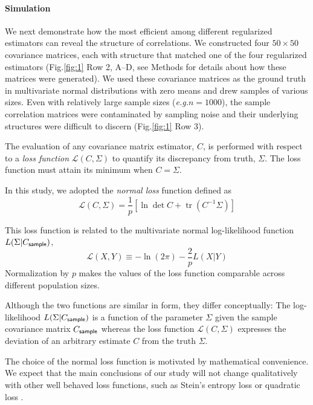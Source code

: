 \documentclass[10pt]{article}
\DeclareMathOperator{\Tr}{tr}
\newcommand{\figref}[2]{Fig.\;\ref{fig:#1}\,#2}
\newcommand{\loss}[1]{\mathcal L\left(#1\right)}
\newcommand{\eg}{\emph{e.g.}\;}
\begin{document}
\paragraph{Simulation}
We next demonstrate how the most efficient among different regularized estimators can reveal the structure of correlations.
We constructed four $50\times 50$ covariance matrices, each with structure that matched one of the four regularized estimators (\figref{1}{\,Row 2, A--D}, see Methods for details about how these matrices were generated).  We used these covariance matrices as the ground truth in multivariate normal distributions with zero means and drew samples of various sizes. Even with relatively large sample sizes (\eg $n=1000$), the sample correlation matrices were contaminated by sampling noise and their underlying structures were difficult to discern (\figref{1}{\,Row 3}). 

The evaluation of any covariance matrix estimator, $C$, is performed with respect to a \emph{loss function} $\loss{C,\Sigma}$ to quantify its discrepancy from truth, $\Sigma$.  The loss function must attain its minimum when $C=\Sigma$.

In this study, we adopted the \emph{normal loss} function defined as
\begin{equation}\label{eq:loss}
    \loss{C,\Sigma} = \frac 1 p\left[\ln \det C + \Tr(C^{-1}\Sigma)\right]
\end{equation}

This loss function is related to the multivariate normal log-likelihood function $L(\Sigma|C_{\sf sample})$,
\begin{equation}
     \loss{X,Y} \equiv -\ln(2\pi) - \frac 2 p L(X|Y)
\end{equation}
Normalization by $p$ makes the values of the loss function comparable across different population sizes. 

Although the two functions are similar in form, they differ conceptually: The log-likelihood $L(\Sigma|C_{\sf sample})$ is a function of the parameter $\Sigma$ given the sample covariance matrix $C_{\sf sample}$ whereas the loss function $\loss{C,\Sigma}$ expresses the deviation of an arbitrary estimate $C$ from the truth $\Sigma$.

The choice of the normal loss function is motivated by mathematical convenience. We expect that the main conclusions of our study will not change qualitatively with other well behaved loss functions, such as Stein's entropy loss or quadratic loss \cite{James:1961, Fan:2008, Ledoit:2004, Schafer:2005}.  
\end{document}
